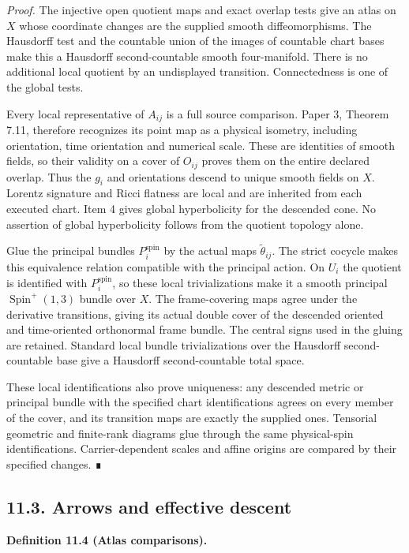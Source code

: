 \documentclass[
  english,
  11pt,
  reqno]{amsart}
\makeatletter
\newcommand{\paperdisplaynext}{%
  \let\paper@savedstartsection\@startsection
  \def\@startsection##1##2##3##4##5##6{%
    \let\@startsection\paper@savedstartsection
    \@tempskipa ##5\relax
    \ifdim\@tempskipa<\z@
      \def\paper@afterskip{.35\baselineskip}%
    \else
      \def\paper@afterskip{##5}%
    \fi
    \@startsection{##1}{##2}{##3}{##4}{\paper@afterskip}{##6}}}
\newcommand{\paperdisplaysection}{\paperdisplaynext\subsection}
\newcommand{\pandocstatementheading}[1]{%
  \par\if@nobreak\else
    \addpenalty{\@beginparpenalty}%
    \addvspace{.5\baselineskip plus .2\baselineskip minus .2\baselineskip}%
  \fi
  {\normalfont\bfseries #1\par}%
  \nobreak\@afterindenttrue\@afterheading
}
\makeatother
\begin{document}
\emph{Proof.} The injective open quotient maps and exact overlap tests
give an atlas on \(X\) whose coordinate changes are the supplied smooth
diffeomorphisms. The Hausdorff test and the countable union of the
images of countable chart bases make this a Hausdorff second-countable
smooth four-manifold. There is no additional local quotient by an
undisplayed transition. Connectedness is one of the global tests.

Every local representative of \(A_{ij}\) is a full source comparison.
Paper 3, Theorem 7.11, therefore recognizes its point map as a physical
isometry, including orientation, time orientation and numerical scale.
These are identities of smooth fields, so their validity on a cover of
\(O_{ij}\) proves them on the entire declared overlap. Thus the \(g_i\)
and orientations descend to unique smooth fields on \(X\). Lorentz
signature and Ricci flatness are local and are inherited from each
executed chart. Item 4 gives global hyperbolicity for the descended
cone. No assertion of global hyperbolicity follows from the quotient
topology alone.

Glue the principal bundles \(P_i^{\mathrm{spin}}\) by the actual maps
\(\widetilde\theta_{ij}\). The strict cocycle makes this equivalence
relation compatible with the principal action. On \(U_i\) the quotient
is identified with \(P_i^{\mathrm{spin}}\), so these local
trivializations make it a smooth principal
\(\operatorname{Spin}^+(1,3)\) bundle over \(X\). The frame-covering
maps agree under the derivative transitions, giving its actual double
cover of the descended oriented and time-oriented orthonormal frame
bundle. The central signs used in the gluing are retained. Standard
local bundle trivializations over the Hausdorff second-countable base
give a Hausdorff second-countable total space.

These local identifications also prove uniqueness: any descended metric
or principal bundle with the specified chart identifications agrees on
every member of the cover, and its transition maps are exactly the
supplied ones. Tensorial geometric and finite-rank diagrams glue through
the same physical-spin identifications. Carrier-dependent scales and
affine origins are compared by their specified changes. ∎

\protect{}\label{sec:ordinary-atlas-arrows-descent}
\paperdisplaysection{11.3. Arrows and effective
descent}\label{arrows-and-effective-descent}
\pandocstatementheading{\protect{}\label{def:ordinary-atlas-embedding-category}Definition 11.4 (Atlas comparisons).}
\end{document}
